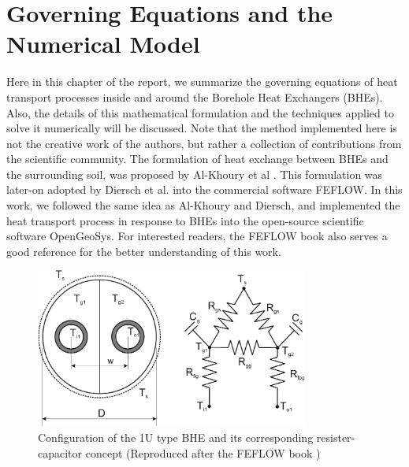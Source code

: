 \chapter{Governing Equations and the Numerical Model}
Here in this chapter of the report, we summarize the governing equations of heat transport processes inside and around the Borehole Heat Exchangers (BHEs).  Also, the details of this mathematical formulation and the techniques applied to solve it numerically will be discussed. Note that the method implemented here is not the creative work of the authors, but rather a collection of contributions from the scientific community. The formulation of heat exchange between BHEs and the surrounding soil, was proposed by Al-Khoury et al \cite{AlKhoury2010}. This formulation was later-on adopted by Diersch et al. \cite{Diersch2011a} \cite{Diersch2011b} into the commercial software FEFLOW. In this work, we followed the same idea as Al-Khoury and Diersch, and implemented the heat transport process in response to BHEs into the open-source scientific software OpenGeoSys. For interested readers, the FEFLOW book \cite{FEFLOW2014} also serves a good reference for the better understanding of this work. 
\begin{figure}
\begin{center}
\includegraphics[width=0.8\textwidth]{fig/crosssection_1U}
\end{center}
\caption{Configuration of the 1U type BHE and its corresponding resister-capacitor concept (Reproduced after the FEFLOW book \cite{FEFLOW2014})}
\label{fig:cross_sec_1u}
\end{figure}
